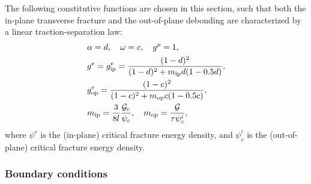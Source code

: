 The following constitutive functions are chosen in this section, such that both the in-plane transverse fracture and the out-of-plane debonding are characterized by a linear traction-separation law:
\begin{subequations}
  \begin{align}
     & \alpha = d, \quad \omega = c, \quad g^p = 1,                                                           \\
     & g^e = g^e_\text{ip} = \dfrac{(1-d)^2}{(1-d)^2 + m_\text{ip} d (1 - 0.5 d)},                            \\
     & g^e_\text{op} = \dfrac{(1-c)^2}{(1-c)^2 + m_\text{op} c (1 - 0.5 c)},                                  \\
     & m_\text{ip} = \dfrac{3}{8l}\dfrac{{\mathcal{G}_c}}{\psi_c}, \quad m_\text{op} = \dfrac{\mathcal{G}}{\tau\psi^i_c}, 
  \end{align}
\end{subequations}
where $\psi^c$ is the (in-plane) critical fracture energy density, and $\psi^i_c$ is the (out-of-plane) critical fracture energy density.

\subsubsection{Boundary conditions}


